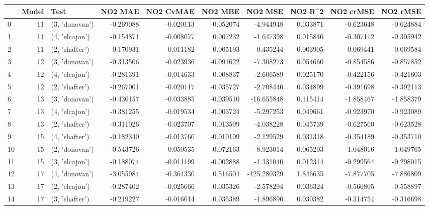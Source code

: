 \begin{tabular}{lrlrrrrrrr}
\toprule
{} &  Model &            Test &   NO2 MAE &  NO2 CvMAE &   NO2 MBE &     NO2 MSE &   NO2 R\textasciicircum2 &  NO2 crMSE &  NO2 rMSE \\
\midrule
0  &     11 &  (3, 'donovan') & -0.269088 &  -0.020113 & -0.052074 &   -4.944948 &  0.033871 &  -0.623648 & -0.624884 \\
1  &     11 &  (4, 'elcajon') & -0.154871 &  -0.008077 &  0.007232 &   -1.647398 &  0.015840 &  -0.307112 & -0.305942 \\
2  &     11 &  (2, 'shafter') & -0.170931 &  -0.011182 & -0.005193 &   -0.435244 &  0.003905 &  -0.069441 & -0.069584 \\
3  &     12 &  (3, 'donovan') & -0.313506 &  -0.023936 & -0.091622 &   -7.308273 &  0.054660 &  -0.854586 & -0.857852 \\
4  &     12 &  (4, 'elcajon') & -0.281391 &  -0.014633 &  0.008837 &   -2.606589 &  0.025170 &  -0.422156 & -0.421603 \\
5  &     12 &  (2, 'shafter') & -0.267001 &  -0.020117 & -0.035727 &   -2.708440 &  0.034899 &  -0.391698 & -0.392113 \\
6  &     13 &  (3, 'donovan') & -0.430157 &  -0.033885 & -0.039510 &  -16.655848 &  0.115414 &  -1.858467 & -1.858379 \\
7  &     13 &  (4, 'elcajon') & -0.381255 &  -0.019534 & -0.003724 &   -5.297253 &  0.049661 &  -0.923970 & -0.923089 \\
8  &     13 &  (2, 'shafter') & -0.311026 &  -0.023707 &  0.013599 &   -4.038228 &  0.045739 &  -0.627560 & -0.623528 \\
9  &     15 &  (4, 'shafter') & -0.182340 &  -0.013760 & -0.010109 &   -2.129529 &  0.031318 &  -0.354189 & -0.353710 \\
10 &     15 &  (2, 'donovan') & -0.543726 &  -0.050535 & -0.072163 &   -8.923014 &  0.065203 &  -1.048016 & -1.049765 \\
11 &     15 &  (3, 'elcajon') & -0.188074 &  -0.011199 & -0.002888 &   -1.331040 &  0.012314 &  -0.299564 & -0.298015 \\
12 &     17 &  (4, 'donovan') & -3.055984 &  -0.364330 &  0.516504 & -125.280329 &  1.846635 &  -7.877705 & -7.886809 \\
13 &     17 &  (2, 'elcajon') & -0.287402 &  -0.025666 &  0.035326 &   -2.578294 &  0.036324 &  -0.560805 & -0.558897 \\
14 &     17 &  (3, 'shafter') & -0.219227 &  -0.016014 &  0.035389 &   -1.896890 &  0.030382 &  -0.314754 & -0.316698 \\

\end{tabular}
